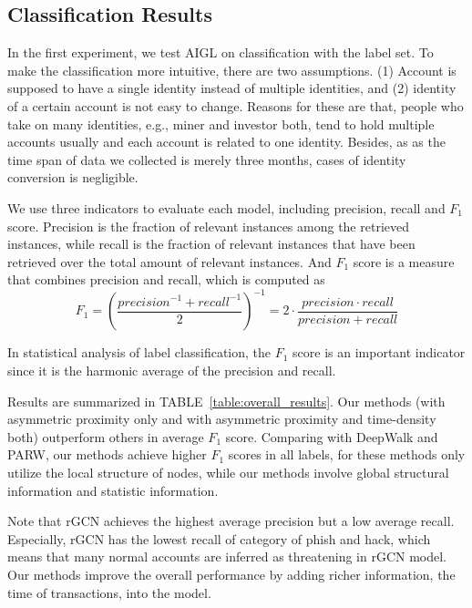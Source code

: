 \subsection{Classification Results}
In the first experiment, we test AIGL on classification with the label set. To make the classification more intuitive, there are two assumptions. (1) Account is supposed to have a single identity instead of multiple identities, and (2) identity of a certain account is not easy to change. Reasons for these are that, people who take on many identities, e.g., miner and investor both, tend to hold multiple accounts usually and each account is related to one identity. Besides, as as the time span of data we collected is merely three months, cases of identity conversion is negligible.

We use three indicators to evaluate each model, including precision, recall and $F_1$ score. Precision is the fraction of relevant instances among the retrieved instances, while recall is the fraction of relevant instances that have been retrieved over the total amount of relevant instances. And $F_1$ score is a measure that combines precision and recall, which is computed as
\begin{equation}
F_1=(\frac{{precision}^{-1}+{recall}^{-1}}{2})^{-1}=2\cdot\frac{precision \cdot recall}{precision + recall}
\end{equation}

In statistical analysis of label classification, the $F_1$ score is an important indicator since it is the harmonic average of the precision and recall.

Results are summarized in TABLE~\ref{table:overall_results}. Our methods (with asymmetric proximity only and with asymmetric proximity and time-density both) outperform others in average $F_1$ score. Comparing with DeepWalk and PARW, our methods achieve higher $F_1$ scores in all labels, for these methods only utilize the local structure of nodes, while our methods involve global structural information and statistic information. 

Note that rGCN achieves the highest average precision but a low average recall. Especially, rGCN has the lowest recall of category of phish and hack, which means that many normal accounts are inferred as threatening in rGCN model. Our methods improve the overall performance by adding richer information, the time of transactions, into the model.

